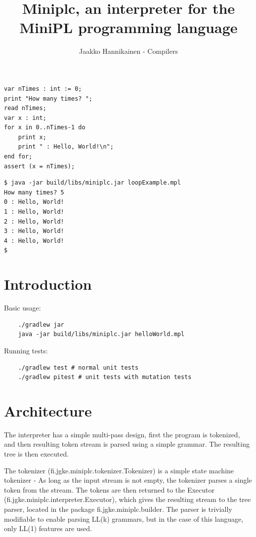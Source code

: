 \documentclass{article}
\author{Jaakko Hannikainen - Compilers}
\title{Miniplc, an interpreter for the MiniPL programming language}
\begin{document}
\maketitle

\noindent
\begin{minipage}{0.49\textwidth}
\begin{verbatim}
var nTimes : int := 0;
print "How many times? ";
read nTimes;
var x : int;
for x in 0..nTimes-1 do
    print x;
    print " : Hello, World!\n";
end for;
assert (x = nTimes);
\end{verbatim}
\end{minipage}
\begin{minipage}{0.49\textwidth}
\begin{verbatim}
$ java -jar build/libs/miniplc.jar loopExample.mpl
How many times? 5
0 : Hello, World!
1 : Hello, World!
2 : Hello, World!
3 : Hello, World!
4 : Hello, World!
$
\end{verbatim}
\end{minipage}

\section{Introduction}
Basic usage:
\begin{verbatim}
    ./gradlew jar
    java -jar build/libs/miniplc.jar helloWorld.mpl
\end{verbatim}

\noindent
Running tests:
\begin{verbatim}
    ./gradlew test # normal unit tests
    ./gradlew pitest # unit tests with mutation tests
\end{verbatim}

\section{Architecture}
The interpreter has a simple multi-pass design, first the program is tokenized,
and then resulting token stream is parsed using a simple grammar. The resulting
tree is then executed.

The tokenizer (fi.jgke.miniplc.tokenizer.Tokenizer) is a simple state machine
tokenizer - As long as the input stream is not empty, the tokenizer parses a
single token from the stream. The tokens are then returned to the Executor
(fi.jgke.miniplc.interpreter.Executor), which gives the resulting stream to the
tree parser, located in the package fi.jgke.miniplc.builder. The parser is
trivially modifiable to enable parsing LL(k) grammars, but in the case of this
language, only LL(1) features are used.
\end{document}
